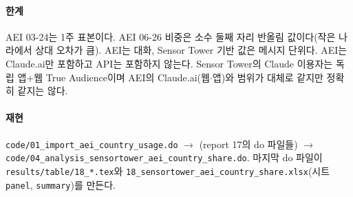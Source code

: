 \documentclass[11pt]{article}
\begin{document}
\paragraph{한계} AEI 03-24는 1주 표본이다. AEI 06-26 비중은 소수 둘째 자리 반올림 값이다(작은 나라에서 상대 오차가 큼). AEI는 대화, Sensor Tower 기반 값은 메시지 단위다. AEI는 Claude.ai만 포함하고 API는 포함하지 않는다. Sensor Tower의 Claude 이용자는 독립 앱+웹 True Audience이며 AEI의 Claude.ai(웹$\cdot$앱)와 범위가 대체로 같지만 정확히 같지는 않다.

\paragraph{재현} \texttt{code/01\_import\_aei\_country\_usage.do} $\to$ (report 17의 do 파일들) $\to$ \texttt{code/04\_analysis\_sensortower\_aei\_country\_share.do}. 마지막 do 파일이 \texttt{results/table/18\_*.tex}와 \texttt{18\_sensortower\_aei\_country\_share.xlsx}(시트 \texttt{panel}, \texttt{summary})를 만든다.

\printbibliography[title={참고문헌}]
\end{document}

